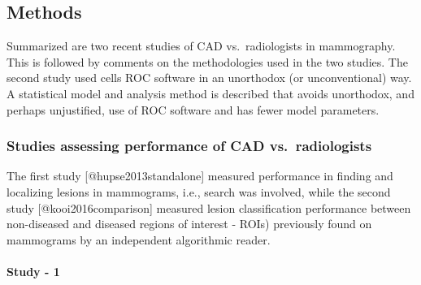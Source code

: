 \documentclass[
]{article}
\begin{document}
\hypertarget{standalone-cad-radiologists-methods}{%
\subsection{Methods}\label{standalone-cad-radiologists-methods}}

Summarized are two recent studies of CAD vs.~radiologists in mammography. This is followed by comments on the methodologies used in the two studies.
The second study used cells ROC software in an unorthodox (or unconventional) way. A statistical model and analysis method is described that avoids unorthodox, and perhaps unjustified, use of ROC software and has fewer model parameters.

\hypertarget{standalone-cad-radiologists-two-previous-studies}{%
\subsubsection{Studies assessing performance of CAD vs.~radiologists}\label{standalone-cad-radiologists-two-previous-studies}}

The first study {[}@hupse2013standalone{]} measured performance in finding and localizing lesions in mammograms, i.e., search was involved, while the second study {[}@kooi2016comparison{]} measured lesion classification performance between non-diseased and diseased regions of interest - ROIs) previously found on mammograms by an independent algorithmic reader.

\hypertarget{standalone-cad-radiologists-study1}{%
\paragraph{Study - 1}\label{standalone-cad-radiologists-study1}}
\end{document}
